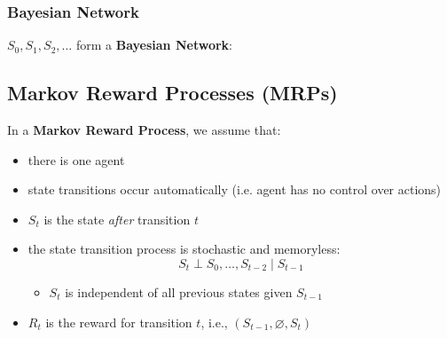 \subsubsection{Bayesian Network}
\begin{notes}
    $S_0,S_1,S_2,\ldots$ form a \textbf{Bayesian Network}:
\end{notes}
\newpage

\subsection{Markov Reward Processes (MRPs)}
\begin{summary}
    In a \textbf{Markov Reward Process}, we assume that:
    \begin{itemize}
        \item there is one agent
        \item state transitions occur automatically (i.e. agent has no control over actions)
        \item $S_t$ is the state \textit{after} transition $t$
        \item the state transition process is stochastic and memoryless:
        \[
        S_t \perp S_0, \dots, S_{t-2} \mid S_{t-1}
        \]
        \begin{itemize}
            \item $S_t$ is independent of all previous states given $S_{t-1}$
        \end{itemize}
        \item $R_t$ is the reward for transition $t$, i.e., $(S_{t-1}, \varnothing, S_t)$
    \end{itemize}
    \vspace{1em}


\end{summary}
